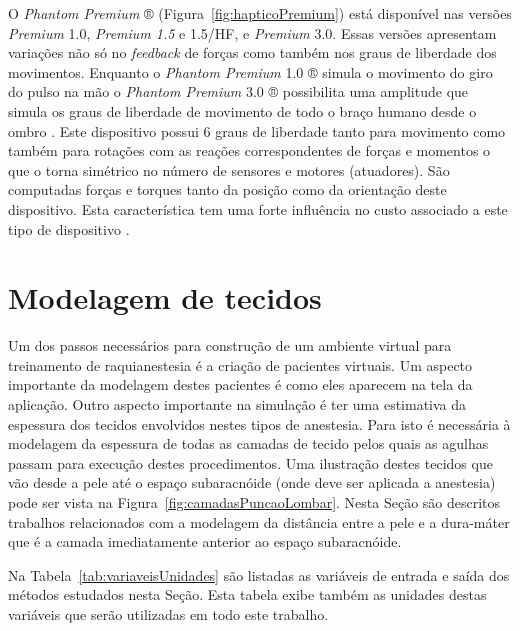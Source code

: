 O \textit{Phantom Premium} ® (Figura~\ref{fig:hapticoPremium}) está disponível nas versões \textit{Premium} 1.0, \textit{Premium 1.5} e 1.5/HF, e \textit{Premium} 3.0. Essas versões apresentam variações não só no \textit{feedback} de forças como também nos graus de liberdade dos movimentos. Enquanto o \textit{Phantom Premium} 1.0 ® simula o movimento do giro do pulso na mão o \textit{Phantom Premium} 3.0 ® possibilita uma amplitude que simula os graus de liberdade de movimento de todo o braço humano desde o ombro \cite{3DSystems2018}. Este dispositivo possui 6 graus de liberdade tanto para movimento como também para rotações com as reações correspondentes de forças e momentos o que o torna simétrico no número de sensores e motores (atuadores). São computadas forças e torques tanto da posição como da orientação deste dispositivo. Esta característica tem uma forte influência no custo associado a este tipo de dispositivo \cite{Forsslund2013}.

\section{Modelagem de tecidos}
\label{sec:modelagemTecidos}

Um dos passos necessários para construção de um ambiente virtual para treinamento de raquianestesia é a criação de pacientes virtuais. Um aspecto importante da modelagem destes pacientes é como eles aparecem na tela da aplicação. Outro aspecto importante na simulação é ter uma estimativa da espessura dos tecidos envolvidos nestes tipos de anestesia. Para isto é necessária à modelagem da espessura de todas as camadas de tecido pelos quais as agulhas passam para execução destes procedimentos. Uma ilustração destes tecidos que vão desde a pele até o espaço subaracnóide (onde deve ser aplicada a anestesia) pode ser vista na Figura~\ref{fig:camadasPuncaoLombar}. Nesta Seção são descritos trabalhos relacionados com a modelagem da distância entre a pele e a dura-máter que é a camada imediatamente anterior ao espaço subaracnóide.

Na Tabela~\ref{tab:variaveisUnidades} são listadas as variáveis de entrada e saída dos métodos estudados nesta Seção. Esta tabela exibe também as unidades destas variáveis que serão utilizadas em todo este trabalho.

